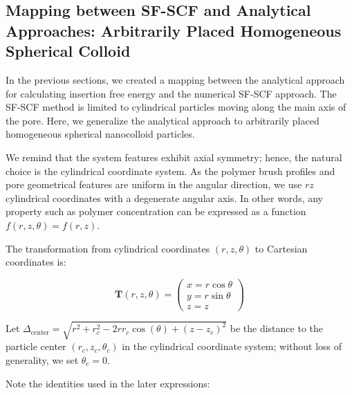 \documentclass[10pt, a4paper]{article}
\begin{document}
\begin{multicols}{2}
\end{multicols}



\subsection*{Mapping between SF-SCF and Analytical Approaches: Arbitrarily Placed Homogeneous Spherical Colloid}

\begin{multicols}{2}

In the previous sections, we created a mapping between the analytical approach for calculating insertion free energy and the numerical SF-SCF approach.
The SF-SCF method is limited to cylindrical particles moving along the main axis of the pore.
Here, we generalize the analytical approach to arbitrarily placed homogeneous spherical nanocolloid particles.

We remind that the system features exhibit axial symmetry; hence, the natural choice is the cylindrical coordinate system.
As the polymer brush profiles and pore geometrical features are uniform in the angular direction, we use $rz$ cylindrical coordinates with a degenerate angular axis.
In other words, any property such as polymer concentration can be expressed as a function $f(r, z, \theta) = f(r, z)$.

The transformation from cylindrical coordinates $(r, z, \theta)$ to Cartesian coordinates is:

\begin{equation}
    \bm{T}(r, z, \theta) = 
    \begin{pmatrix}
        x = r \cos \theta\\
        y = r \sin \theta\\
        z = z
    \end{pmatrix}
\end{equation}

Let $\Delta_{\textrm{center}} = \sqrt{r^2 + r_c^2 - 2 r r_c \cos(\theta) + (z - z_c)^2}$ be the distance to the particle center $(r_c, z_c, \theta_c)$ in the cylindrical coordinate system; without loss of generality, we set $\theta_c = 0$.

Note the identities used in the later expressions:


\end{multicols}
\end{document}
